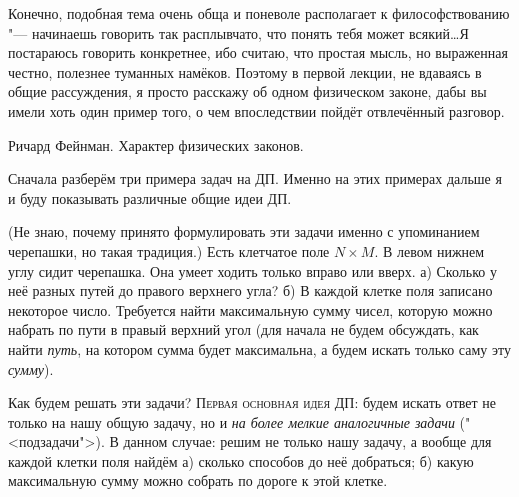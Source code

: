 
\epigraph{Конечно, подобная тема очень обща и поневоле располагает к философствованию "--- 
начинаешь говорить так расплывчато, что понять тебя может всякий\dots Я постараюсь говорить конкретнее, ибо считаю,
что простая мысль, но выраженная честно, полезнее туманных намёков. Поэтому в первой лекции, не 
вдаваясь в общие рассуждения, я просто расскажу об одном физическом законе, дабы вы имели хоть один 
пример того, о чем впоследствии пойдёт отвлечённый разговор.}{Ричард Фейнман. Характер физических 
законов.}

Сначала разберём три примера задач на ДП. Именно на этих примерах дальше я и буду показывать 
различные общие идеи ДП.

 (Не знаю, почему принято формулировать эти задачи именно с 
упоминанием черепашки, но такая традиция.) Есть клетчатое поле $N\times M$. В левом нижнем углу 
сидит черепашка. Она умеет ходить только вправо или вверх. а) Сколько у неё разных путей до правого 
верхнего угла? б) В каждой клетке поля записано некоторое число. Требуется найти максимальную сумму чисел, 
которую можно набрать по пути в правый верхний угол (для начала не будем обсуждать, как найти 
\textit{путь}, на котором сумма будет максимальна, а будем искать только саму эту \textit{сумму}).

Как будем решать эти задачи? \textsc{Первая основная идея ДП:} будем искать ответ не только на нашу 
общую задачу, но и \textit{на более мелкие аналогичные задачи} ("<подзадачи">). В данном случае: решим не только нашу 
задачу, а вообще для каждой клетки поля найдём а) сколько способов до неё добраться; б) какую 
максимальную сумму можно собрать по дороге к этой клетке.

